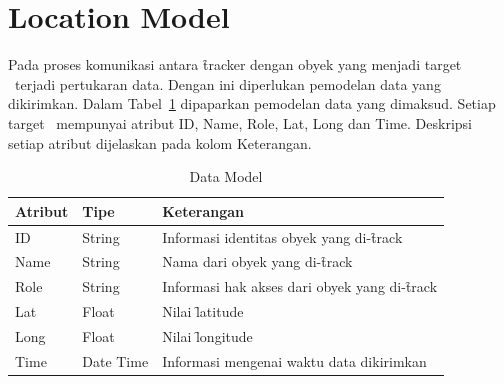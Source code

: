 

       

\section{Location Model}
\label{sec:location_model}

Pada proses komunikasi antara \f{tracker} dengan obyek yang menjadi target
\tracking~terjadi pertukaran data. Dengan ini diperlukan pemodelan data yang
dikirimkan. Dalam Tabel~\ref{tab:model} dipaparkan pemodelan data yang dimaksud.
Setiap target \tracking~mempunyai atribut ID, Name, Role, Lat, Long dan Time.
Deskripsi setiap atribut dijelaskan pada kolom Keterangan. 

\begin{table}
\centering
\caption{Data Model}
\label{tab:model}
\begin{tabular}{l l l}
        \hline
        Atribut & Tipe & Keterangan \\
        \hline
        ID      & String    & Informasi identitas obyek yang di-\f{track} \\
        Name    & String    & Nama dari obyek yang di-\f{track} \\
        Role    & String    & Informasi hak akses dari obyek yang di-\f{track} \\
        Lat     & Float     & Nilai \f{latitude} \\
        Long    & Float     & Nilai \f{longitude} \\
        Time    & Date Time & Informasi mengenai waktu data dikirimkan \\
        \hline
    \end{tabular}
\end{table}

